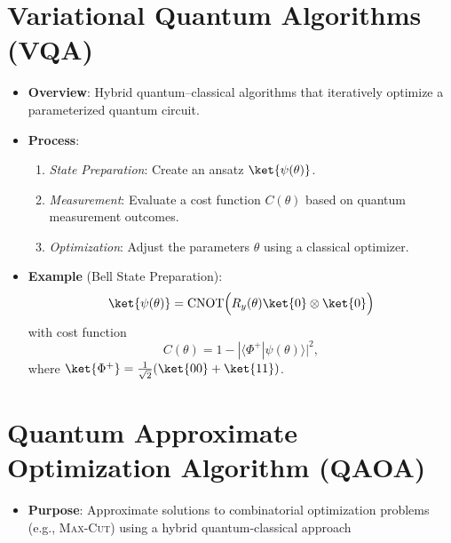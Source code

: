\begin{multicols}{3}
                  \section*{Variational Quantum Algorithms (VQA)}
                  \begin{itemize}[leftmargin=*,nosep,topsep=0pt]
                    \item \textbf{Overview}: Hybrid quantum–classical
                      algorithms that iteratively optimize a parameterized
                      quantum circuit.
                    \item \textbf{Process}:
                      \begin{enumerate}[nosep]
                        \item \textit{State Preparation}: Create an ansatz
                          $\ket{\psi(\theta)}$.
                        \item \textit{Measurement}: Evaluate a cost function
                          $C(\theta)$ based on quantum measurement outcomes.
                        \item \textit{Optimization}: Adjust the parameters
                          $\theta$ using a classical optimizer.
                      \end{enumerate}
                    \item \textbf{Example} (Bell State Preparation):
                      \[
                        \ket{\psi(\theta)} = \mathrm{CNOT}\Bigl(R_y(\theta)\ket{0}\otimes\ket{0}\Bigr)
                      \]
                      with cost function
                      \[
                        C(\theta)=1-|\langle\Phi^+|\psi(\theta)\rangle|^2,
                      \]
                      where $\ket{\Phi^+}=\frac{1}{\sqrt{2}}(\ket{00}+\ket{11})$.
                  \end{itemize}

                  \section*{Quantum Approximate Optimization Algorithm (QAOA)}
                  \begin{itemize}[leftmargin=*,nosep,topsep=0pt]
                    \item \textbf{Purpose}: Approximate solutions to
                      combinatorial optimization problems (e.g., \textsc{Max-Cut})
                      using a hybrid quantum-classical approach


\end{itemize}
\end{multicols}
